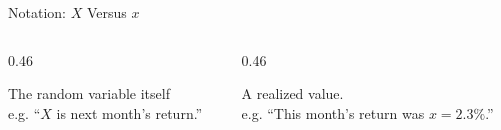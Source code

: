 \documentclass[9pt,english,aspectratio=169]{beamer}
\begin{document}
\begin{frame}{Notation: $X$ Versus $x$}


  \vspace{0.8em}
  \begin{columns}[T]
    \begin{column}{0.46\textwidth}
      \begin{definitionbox}[$X$ --- uppercase]
        The random variable itself \\

        e.g. ``$X$ is next month's return.''
      \end{definitionbox}
    \end{column}
    \pause
    \begin{column}{0.46\textwidth}
      \begin{definitionbox}[$x$ --- lowercase]
        A realized value. \\

        e.g. ``This month's return was $x = 2.3\%$.''
      \end{definitionbox}
    \end{column}
  \end{columns}

\end{frame}
\end{document}
